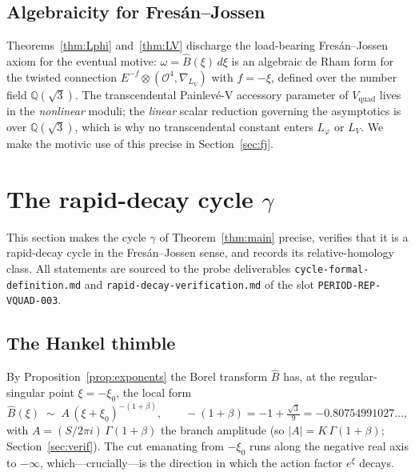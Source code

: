 \documentclass[11pt,reqno]{amsart}
\renewcommand{\_}{\vquadorigunderscore\allowbreak}
\theoremstyle{plain}
\theoremstyle{definition}
\newcommand{\Vquad}{V_{\mathrm{quad}}}
\newcommand{\Bhat}{\widehat{B}}
\newcommand{\Lphi}{L_{\varphi}}
\newcommand{\LV}{L_{V}}
\newcommand{\Qsqrt}{\mathbb{Q}(\sqrt3)}
\newcommand{\xizero}{\xi_0}
\begin{document}
\subsection{Algebraicity for Fres\'an--Jossen}
Theorems~\ref{thm:Lphi} and~\ref{thm:LV} discharge the load-bearing Fres\'an--Jossen axiom for
the eventual motive: $\omega=\Bhat(\xi)\,d\xi$ is an algebraic de Rham form for the twisted
connection $E^{-f}\otimes(\mathcal{O}^4,\nabla_{\LV})$ with $f=-\xi$, defined over the number
field $\Qsqrt$. The transcendental Painlev\'e-V accessory parameter of $\Vquad$ lives in the
\emph{nonlinear} moduli; the \emph{linear} scalar reduction governing the asymptotics is over
$\Qsqrt$, which is why no transcendental constant enters $\Lphi$ or $\LV$. We make the motivic
use of this precise in Section~\ref{sec:fj}.

\section{The rapid-decay cycle \texorpdfstring{$\gamma$}{gamma}}\label{sec:cycle}

This section makes the cycle $\gamma$ of Theorem~\ref{thm:main} precise, verifies that it is a
rapid-decay cycle in the Fres\'an--Jossen sense, and records its relative-homology class. All
statements are sourced to the probe deliverables
\texttt{cycle-formal-definition.md} and \texttt{rapid-decay-verification.md} of the slot
\texttt{PERIOD-REP-VQUAD-003}.

\subsection{The Hankel thimble}
By Proposition~\ref{prop:exponents} the Borel transform $\Bhat$ has, at the regular-singular
point $\xi=-\xizero$, the local form
\begin{equation}\label{eq:branch-local}
  \Bhat(\xi)\;\sim\;A\,(\xi+\xizero)^{-(1+\beta)},\qquad
  -(1+\beta)=-1+\tfrac{\sqrt3}{9}=-0.80754991027\ldots,
\end{equation}
with $A=(S/2\pi i)\,\Gamma(1+\beta)$ the branch amplitude (so $\lvert A\rvert=K\,\Gamma(1+\beta)$;
Section~\ref{sec:verif}). The cut emanating from $-\xizero$ runs along the negative real axis to
$-\infty$, which---crucially---is the direction in which the action factor $e^{\xi}$ decays.
\end{document}
